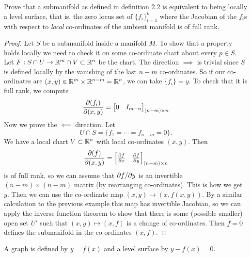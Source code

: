 \begin{exer}[2.7]
  Prove that a submanifold as defined in definition 2.2 is equivalent to being locally a level surface, that is, the zero locus set of $\{f_i\}_{i=1}^k$ where the Jacobian of the $f_i$s with respect to \emph{local} co-ordinates of the ambient manifold is of full rank.
\end{exer}

\begin{proof}
  Let $S$ be a submanifold inside a manifold $M$.
  To show that a property holds locally we need to check it on some co-ordinate chart about every $p \in S$.
  Let $F: S \cap U \to \mathbb{R}^m \cap V \subset \mathbb{R}^n$ be the chart.
  The direction $\implies$ is trivial since $S$ is defined locally by the vanishing of the last $n-m$ co-ordinates.
  So if our co-ordinates are $(x,y) \in \mathbb{R}^m \times \mathbb{R}^{n-m} = \mathbb{R}^n$, we can take $\{f_i\}=y$.
  To check that it is full rank, we compute
  \begin{equation*}
    \frac{\partial(f_i)}{\partial(x,y)}=
    \begin{bmatrix}
      0 & I_{m-n}
    \end{bmatrix}_{(n-m) \times n}
  \end{equation*}
  Now we prove the $\impliedby$ direction.
  Let
  \[ U \cap S = \{ f_1 = \cdots = f_{n-m} = 0 \}. \]
  We have a local chart $V \subset \mathbb{R}^n$ with local co-ordinates $(x,y)$.
  Then
  \begin{equation*}
    \frac{\partial(f)}{\partial(x,y)}=
    \begin{bmatrix}
      \frac{\partial f}{\partial x} & \frac{\partial f}{\partial y}
    \end{bmatrix}_{(n-m) \times n}
  \end{equation*}
  is of full rank, so we can assume that $\partial f/\partial y$ is an invertible $(n-m) \times (n-m)$ matrix (by rearranging co-ordinates).
  This is how we get $y$.
  Then we can use the co-ordinate map $(x,y) \mapsto (x,f(x,y))$.
  By a similar calculation to the previous example this map has invertible Jacobian, so we can apply the inverse function theorem to show that there is some (possible smaller) open set $U'$ such that $(x,y) \mapsto (x,f)$ is a change of co-ordinates.
  Then $f=0$ defines the submanifold in the co-ordinates $(x,f)$.
\end{proof}

\begin{rmk}
  A graph is defined by $y=f(x)$ and a level surface by $y-f(x)=0$.
\end{rmk}

